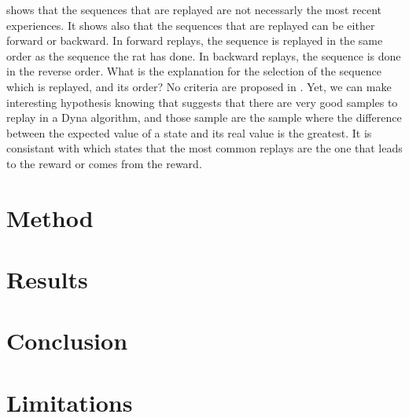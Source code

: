 \documentclass[]{article}
\begin{document}
\textcite{gupta_hippocampal_2010} shows that the sequences that are replayed are not necessarly the most recent experiences. It shows also that the sequences that are replayed can be either forward or backward. In forward replays, the sequence is replayed in the same order as the sequence the rat has done. In backward replays, the sequence is done in the reverse order. What is the explanation for the selection of the sequence which is replayed, and its order? No criteria are proposed in \textcite{gupta_hippocampal_2010}. Yet, we can make interesting hypothesis knowing that \textcite{sutton_dyna-style_2012} suggests that there are very good samples to replay in a Dyna algorithm, and those sample are the sample where the difference between the expected value of a state and its real value is the greatest. It is consistant with \textcite{gupta_hippocampal_2010} which states that the most common replays are the one that leads to the reward or comes from the reward.

\section{Method}\label{method}

\section{Results}\label{results}

\section{Conclusion}\label{conclusion}

\section{Limitations}\label{limitations}


\printbibliography{}
\end{document}
